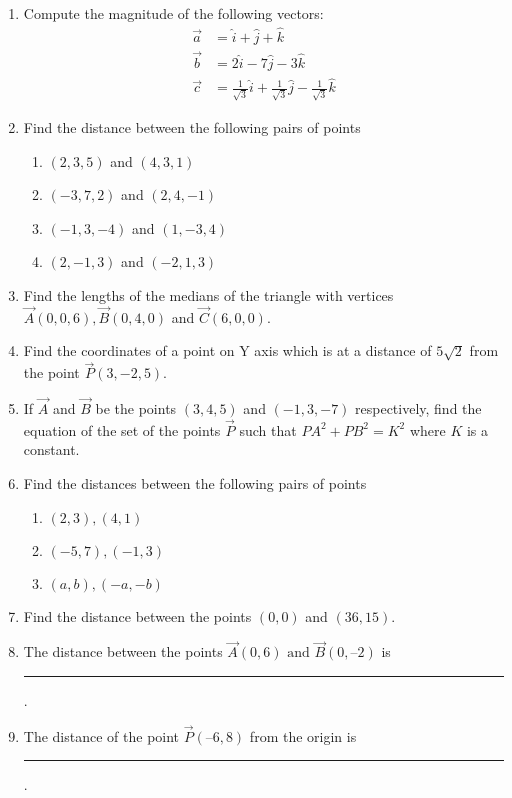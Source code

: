 \begin{enumerate}[label=\thesubsection.\arabic*, ref=\thesubsection.\theenumi]
\item Compute the magnitude of the following vectors:
\begin{align}
	\vec{a}&=\hat{i}+\hat{j}+\hat{k}
	\\
	\vec{b}&=2\hat{i}-7\hat{j}-3\hat{k}
	\\
	\vec{c}&=\frac{1}{\sqrt{3}}\hat{i}+\frac{1}{\sqrt{3}}\hat{j}-\frac{1}{\sqrt{3}}\hat{k}
\end{align}
    \solution 
		
\item Find the distance between the following pairs of points
\begin{enumerate}[label=(\roman*)]
\item $(2, 3, 5)$ and $(4, 3, 1)$
\item $(-3, 7, 2)$ and $(2, 4, -1)$
\item $(-1, 3, -4)$ and $(1, -3, 4)$
\item $(2, -1, 3)$ and $(-2, 1, 3)$
\end{enumerate}
\item Find the lengths of the medians of the triangle with vertices $\vec{A}(0, 0, 6),  \vec{B}(0, 4, 0)$ and $\vec{C}(6, 0, 0)$.
\item Find the coordinates of a point on Y axis which is at a distance of $5\sqrt2$ from the point $\vec{P}(3, -2, 5)$.
\item If $\vec{A}$ and $\vec{B}$ be the points $(3, 4, 5)$ and $(-1, 3, -7)$ respectively,  find the equation of the set of the points $\vec{P}$ such that $PA^2+PB^2=K^2$ where $K$ is a constant.
\item Find the distances between the following pairs of points
\begin{enumerate}
\item $(2, 3), (4, 1)$
\item $(-5, 7), (-1, 3)$
\item $(a, b), (-a, -b)$
\end{enumerate}
\solution
		
\item Find the distance between the points $(0, 0)$ and $ (36, 15)$.
	\\
		\solution
		
\item The distance between the points $\vec{A}(0,  6) \text{ and } \vec{B}(0,  –2)$ is \rule{1cm}{0.1pt}.
\item The distance of the point $\vec{P} (–6,  8)$ from the origin is \rule{1cm}{0.1pt}.

\end{enumerate}
